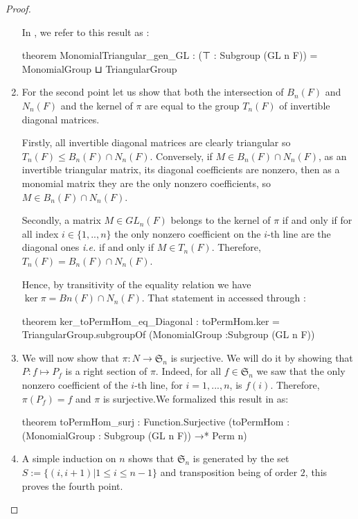 \begin{proof}
\begin{enumerate}
In \Lean, we refer to this result as :
\begin{leancode}
theorem MonomialTriangular_gen_GL : 
    (⊤ : Subgroup (GL n F)) = MonomialGroup ⊔ TriangularGroup
\end{leancode}


\item \label{GL2} For the second point let us show that both the intersection of $B_n(F)$ and $N_n\left( F \right)$ and the kernel of $\pi$ are equal to the group $T_n\left( F \right)$ of invertible diagonal matrices. 

    Firstly, all invertible diagonal matrices are clearly triangular so $T_n\left( F \right) \le  B_n\left( F \right) \cap N_n(F)$. Conversely, if $M \in B_n(F) \cap  N_n(F)$, as an invertible triangular matrix, its diagonal coefficients are nonzero, then as a monomial matrix they are the only nonzero coefficients, so $M \in B_n(F) \cap N_n(F)$.

    Secondly, a matrix $M \in GL_n(F)$ belongs to the kernel of $\pi$ if and only if for all index $i \in  \{ 1,..,n\}$ the only nonzero coefficient on the $i$-th line are the diagonal ones \textit{i.e.} if and only if $M \in T_n\left( F \right)$. Therefore, $T_n\left( F \right) = B_n\left( F \right) \cap N_n(F)$.

    Hence, by transitivity of the equality relation we have $\ker \pi = Bn(F) \cap N_n(F)$. That statement in accessed through :
    \begin{leancode}
theorem ker_toPermHom_eq_Diagonal :
  toPermHom.ker = TriangularGroup.subgroupOf (MonomialGroup :Subgroup (GL n F))
    \end{leancode}
    

\item \label{GL3}We will now show that $\pi : N \to \mathfrak{S}_n$ is surjective. We will do it by showing that $P : f \mapsto P_f $ is a right section of $\pi$. Indeed, for all $f \in \mathfrak{S}_n$ we saw that the only nonzero coefficient of the $i$-th line, for $i=1,...,n$, is $f(i)$. Therefore, $\pi\left( P_f \right) = f$ and $\pi$ is surjective.We formalized this result in \Lean as:
\begin{leancode}
theorem toPermHom_surj :
  Function.Surjective (toPermHom : (MonomialGroup : Subgroup (GL n F)) →* Perm n)
\end{leancode}

\item A simple induction on $n$ shows that $\mathfrak{S}_n$ is generated by the set $S:= \{\left( i,i+1 \right) | 1\le i\le n-1\}$ and transposition being of order $2$, this proves the fourth point. 


\end{enumerate}
\end{proof}
